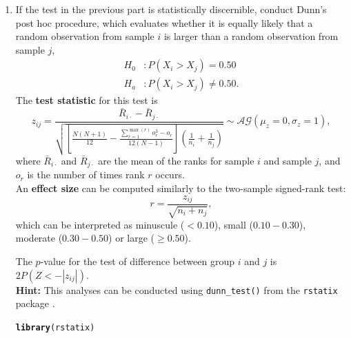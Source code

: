 \documentclass{article}\usepackage[]{graphicx}\usepackage[]{xcolor}
\makeatletter
\newcommand{\hldef}[1]{\textcolor[rgb]{0.345,0.345,0.345}{#1}}%
\newcommand{\hlkwd}[1]{\textcolor[rgb]{0.737,0.353,0.396}{\textbf{#1}}}%
\newenvironment{kframe}{%
 \def\at@end@of@kframe{}%
 \ifinner\ifhmode%
  \def\at@end@of@kframe{\end{minipage}}%
  \begin{minipage}{\columnwidth}%
 \fi\fi%
 \def\FrameCommand##1{\hskip\@totalleftmargin \hskip-\fboxsep
 \colorbox{shadecolor}{##1}\hskip-\fboxsep
     \hskip-\linewidth \hskip-\@totalleftmargin \hskip\columnwidth}%
 \MakeFramed {\advance\hsize-\width
   \@totalleftmargin\z@ \linewidth\hsize
   \@setminipage}}%
 {\par\unskip\endMakeFramed%
 \at@end@of@kframe}
\newenvironment{knitrout}{}{} %
\makeatother
\begin{document}
\begin{enumerate}
\begin{enumerate}
\textcolor{red}{After performing a Kruskal-Wallis test, we obtain a test statistic $\chi^2$ of 16.325 ($p = 0.0003$, $\eta^2 = 0.10$). This tells us that there is a statistcally discernible difference in ARGs across types of microplastic diversity because $p < \alpha = 0.05$. A $\eta^2$ of 0.10 tells us that the effect of microplastic diversity on ARGs is moderate.}

\item If the test in the previous part is statistically discernible, conduct
Dunn's post hoc procedure, which evaluates whether it is equally likely that a 
random observation from sample $i$ is	larger than a random observation from 
sample $j$,
\begin{align*}
H_0&: P(X_i>X_j)=0.50\\
H_a&: P(X_i>X_j) \neq 0.50.
\end{align*}
The \textbf{test statistic} for this test is 
\[z_{ij} = \frac{\bar{R}_{i\cdot} - \bar{R}_{j\cdot}}{\sqrt{\left[\frac{N(N+1)}{12} - \frac{\sum_{r=1}^{\max(r)} o_r^3-o_r}{12(N-1)}\right]\left(\frac{1}{n_i}+\frac{1}{n_j}\right)}} \sim \mathcal{AG}(\mu_z=0,\sigma_z=1),\]
where $\bar{R}_{i\cdot}$ and $\bar{R}_{j\cdot}$ are the mean of the ranks for sample $i$ and sample $j$, and $o_r$ is the number of times rank $r$ occurs.\\

An \textbf{effect size} can be computed similarly to the two-sample signed-rank test:
\[r = \frac{z_{ij}}{\sqrt{n_i+n_j}},\]
which can be interpreted as minuscule ($<0.10$), small ($0.10-0.30$), 
moderate ($0.30-0.50$) or large ($\geq 0.50$).

The $p$-value for the test of difference between group $i$ and $j$ is $2P(Z<-|z_{ij}|).$\\

\textbf{Hint:} This analyses can be conducted using \texttt{dunn\_test()} from
the \texttt{rstatix} package \cite{rstatix}.

\begin{knitrout}\scriptsize
{}\color{fgcolor}\begin{kframe}
\begin{alltt}
\hlkwd{library}\hldef{(rstatix)}


\end{alltt}
\end{kframe}
\end{knitrout}
\end{enumerate}
\end{enumerate}
\end{document}
